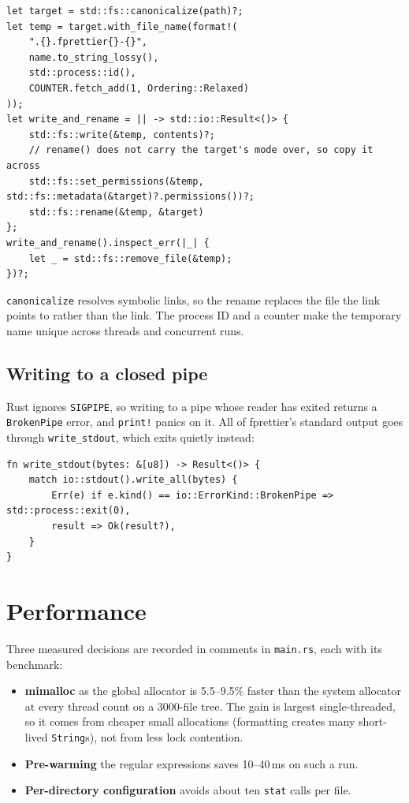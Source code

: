 \documentclass[11pt,a4paper,openany]{book}
\newcommand{\code}[1]{\texttt{\small #1}}
\newcommand{\file}[1]{\texttt{\small\color{accent}#1}}
\begin{document}
\begin{lstlisting}[style=rust]
let target = std::fs::canonicalize(path)?;
let temp = target.with_file_name(format!(
    ".{}.fprettier{}-{}",
    name.to_string_lossy(),
    std::process::id(),
    COUNTER.fetch_add(1, Ordering::Relaxed)
));
let write_and_rename = || -> std::io::Result<()> {
    std::fs::write(&temp, contents)?;
    // rename() does not carry the target's mode over, so copy it across
    std::fs::set_permissions(&temp, std::fs::metadata(&target)?.permissions())?;
    std::fs::rename(&temp, &target)
};
write_and_rename().inspect_err(|_| {
    let _ = std::fs::remove_file(&temp);
})?;
\end{lstlisting}

\code{canonicalize} resolves symbolic links, so the rename replaces the file
the link points to rather than the link. The process ID and a counter make the
temporary name unique across threads and concurrent runs.

\subsection{Writing to a closed pipe}

Rust ignores \code{SIGPIPE}, so writing to a pipe whose reader has exited
returns a \code{BrokenPipe} error, and \code{print!} panics on it. All of
fprettier's standard output goes through \code{write\_stdout}, which exits
quietly instead:

\begin{lstlisting}[style=rust]
fn write_stdout(bytes: &[u8]) -> Result<()> {
    match io::stdout().write_all(bytes) {
        Err(e) if e.kind() == io::ErrorKind::BrokenPipe => std::process::exit(0),
        result => Ok(result?),
    }
}
\end{lstlisting}

\section{Performance}

Three measured decisions are recorded in comments in \file{main.rs}, each with
its benchmark:

\begin{itemize}
  \item \textbf{mimalloc} as the global allocator is 5.5--9.5\% faster than the
    system allocator at every thread count on a 3000-file tree. The gain is
    largest single-threaded, so it comes from cheaper small allocations
    (formatting creates many short-lived \code{String}s), not from less lock
    contention.
  \item \textbf{Pre-warming} the regular expressions saves 10--40\,ms on such
    a run.
  \item \textbf{Per-directory configuration} avoids about ten \code{stat}
    calls per file.
\end{itemize}
\end{document}
